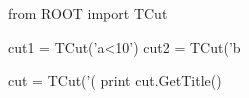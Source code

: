 \begin{footnotesize}
\begin{pyglist}[language=python,texcl=true,style=vs,bgcolor=Moccasin]
from ROOT import TCut

cut1 = TCut('a<10')
cut2 = TCut('b%

cut = TCut('(%
print cut.GetTitle()
\end{pyglist}
\end{footnotesize}
